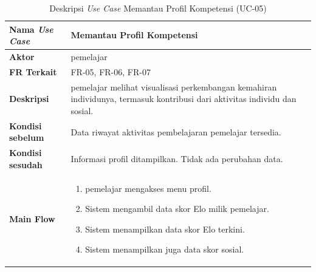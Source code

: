 \begin{table}[H]
    \centering
    \caption{Deskripsi \textit{Use Case} Memantau Profil Kompetensi (UC-05)}
    \label{tbl:desc_uc05}
    \begin{tabular}{|p{}|p{}|}
        \hline
        \textbf{Nama \textit{Use Case}} & \textbf{Memantau Profil Kompetensi} \\
        \hline
        \textbf{Aktor} & pemelajar \\
        \hline
        \textbf{FR Terkait} & FR-05, FR-06, FR-07 \\
        \hline
        \textbf{Deskripsi} & pemelajar melihat visualisasi perkembangan kemahiran individunya, termasuk kontribusi dari aktivitas individu dan sosial. \\
        \hline
        \textbf{Kondisi sebelum} & Data riwayat aktivitas pembelajaran pemelajar tersedia. \\
        \hline
        \textbf{Kondisi sesudah} & Informasi profil ditampilkan. Tidak ada perubahan data. \\
        \hline
        \textbf{Main Flow} & \begin{enumerate}[noitemsep,topsep=0pt,leftmargin=*]
            \item pemelajar mengakses menu profil.
            \item Sistem mengambil data skor Elo milik pemelajar.
            \item Sistem menampilkan data skor Elo terkini.
            \item Sistem menampilkan juga data skor sosial.
        \end{enumerate} \\
        \hline
    \end{tabular}
\end{table}